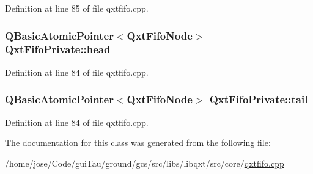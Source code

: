 Definition at line 85 of file qxtfifo.\-cpp.

\hypertarget{class_qxt_fifo_private_a5f3f198e97cfd5fd77d23278622fe15b}{
\subsubsection[{head}]{\setlength{\rightskip}{0pt plus 5cm}Q\-Basic\-Atomic\-Pointer$<${\bf Qxt\-Fifo\-Node}$>$ Qxt\-Fifo\-Private\-::head}}\label{class_qxt_fifo_private_a5f3f198e97cfd5fd77d23278622fe15b}


Definition at line 84 of file qxtfifo.\-cpp.

\hypertarget{class_qxt_fifo_private_a1b84b3391bf3eca7eccd5cddc88faada}{
\subsubsection[{tail}]{\setlength{\rightskip}{0pt plus 5cm}Q\-Basic\-Atomic\-Pointer$<${\bf Qxt\-Fifo\-Node}$>$ Qxt\-Fifo\-Private\-::tail}}\label{class_qxt_fifo_private_a1b84b3391bf3eca7eccd5cddc88faada}


Definition at line 84 of file qxtfifo.\-cpp.



The documentation for this class was generated from the following file\-:\begin{DoxyCompactItemize}
\item 
/home/jose/\-Code/gui\-Tau/ground/gcs/src/libs/libqxt/src/core/\hyperlink{qxtfifo_8cpp}{qxtfifo.\-cpp}\end{DoxyCompactItemize}
